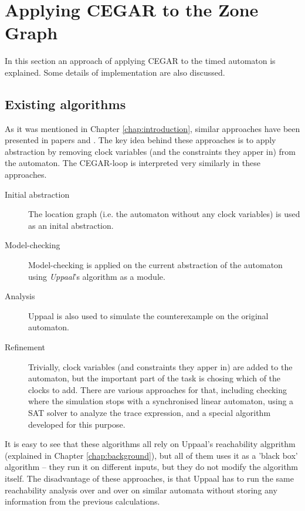 \chapter{Applying CEGAR to the Zone Graph} \label{sec:timed_cegar}

In this section an approach of applying CEGAR to the timed
automaton is explained. Some details of implementation are also
discussed.

\section{Existing algorithms}
  
 As it was mentioned in Chapter \ref{chap:introduction}, similar approaches have been presented in papers \cite{dierks2007automatic, he2010compositional} and \cite{okano2011clock}. The key idea behind these approaches
 is to apply abstraction by removing clock variables (and the constraints they apper in) from the automaton. The CEGAR-loop is interpreted very similarly in these approaches.
 
 \begin{description}
 	\item[Initial abstraction] The location graph (i.e. the automaton without any clock variables) is used as an inital abstraction.
 	\item[Model-checking] Model-checking is applied on the current abstraction of the automaton using \emph{Uppaal}'s algorithm as a module.
 	\item[Analysis] Uppaal is also used to simulate the counterexample on the original automaton.
 	\item[Refinement] Trivially, clock variables (and constraints they apper in) are added to the automaton, but the important part of the task is chosing which of the clocks to add. There are various approaches for that, including checking where the simulation stops with a synchronised linear automaton, using a SAT solver to analyze the trace expression, and a special algorithm developed for this purpose.
 \end{description}
 
 It is easy to see that these algorithms all rely on Uppaal's reachability algprithm (explained in Chapter \ref{chap:background}), but all of them uses it as a 'black box' algorithm -- they run it on different inputs, but they do not modify the algorithm itself. The disadvantage of these approaches, is that Uppaal has to run the same reachability analysis over and over on similar automata without storing any information from the previous calculations.
 
